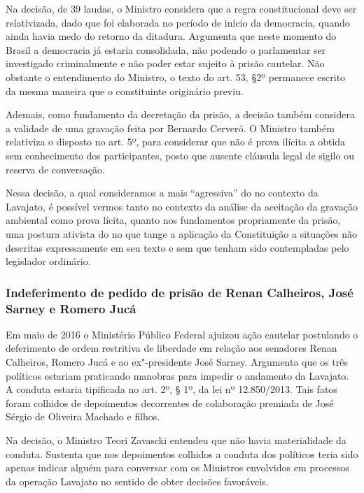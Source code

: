 Na decisão, de 39 laudas, o Ministro considera que a regra
constitucional deve ser relativizada, dado que foi elaborada no período
de início da democracia, quando ainda havia medo do retorno da ditadura.
Argumenta que neste momento do Brasil a democracia já estaria
consolidada, não podendo o parlamentar ser investigado criminalmente e
não poder estar sujeito à prisão cautelar. Não obstante o entendimento
do Ministro, o texto do art. 53, §2º permanece escrito da mesma maneira
que o constituinte originário previu.

Ademais, como fundamento da decretação da prisão, a decisão também
considera a validade de uma gravação feita por Bernardo Cerveró. O
Ministro também relativiza o disposto no art. 5º,  para considerar
que não é prova ilícita a obtida sem conhecimento dos participantes,
posto que ausente cláusula legal de sigilo ou reserva de conversação.

Nessa decisão, a qual consideramos a mais ``agressiva'' do  no
contexto da Lavajato, é possível vermos tanto no contexto da análise da
aceitação da gravação ambiental como prova lícita, quanto nos
fundamentos propriamente da prisão, uma postura ativista do  no que
tange a aplicação da Constituição a situações não descritas
expressamente em seu texto e sem que tenham sido contempladas pelo
legislador ordinário.

\subsubsection{Indeferimento de pedido de prisão de Renan Calheiros,
José Sarney e Romero Jucá}

Em maio de 2016 o Ministério Público Federal ajuizou ação cautelar
postulando o deferimento de ordem restritiva de liberdade em relação aos
senadores Renan Calheiros, Romero Jucá e ao ex"-presidente José Sarney.
Argumenta que os três políticos estariam praticando manobras para
impedir o andamento da Lavajato. A conduta estaria tipificada no art.
2º, § 1º, da lei nº 12.850/2013. Tais fatos foram colhidos de
depoimentos decorrentes de colaboração premiada de José Sérgio de
Oliveira Machado e filhos.

Na decisão, o Ministro Teori Zavascki entendeu que não havia
materialidade da conduta. Sustenta que nos depoimentos colhidos a
conduta dos políticos teria sido apenas indicar alguém para conversar
com os Ministros envolvidos em processos da operação Lavajato no
sentido de obter decisões favoráveis.

